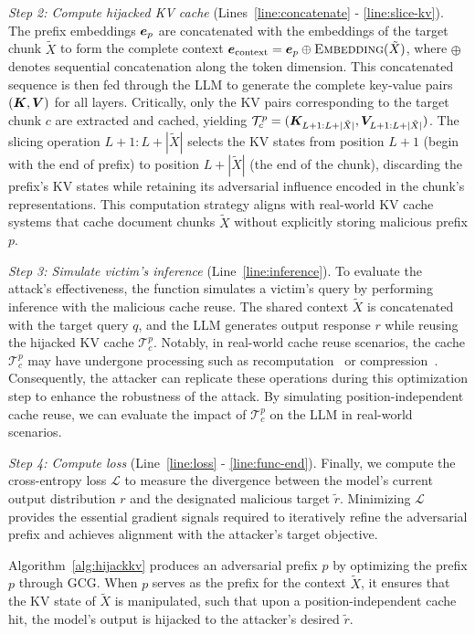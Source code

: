 \textit{Step 2: Compute hijacked KV cache} (Lines~\ref{line:concatenate} - \ref{line:slice-kv}). The prefix embeddings $\bm{e}_p$ are concatenated with the embeddings of the target chunk $\tilde{X}$ to form the complete context $\bm{e}_{\text{context}} = \bm{e}_p \oplus \textsc{Embedding}(\tilde{X})$, where $\oplus$ denotes sequential concatenation along the token dimension. This concatenated sequence is then fed through the LLM to generate the complete key-value pairs $(\bm{K}, \bm{V})$ for all layers. Critically, only the KV pairs corresponding to the target chunk $c$ are extracted and cached, yielding $\mathcal{T}^p_c = (\bm{K}_{L+1:L+|\tilde{X}|}, \bm{V}_{L+1:L+|\tilde{X}|})$. The slicing operation $L+1:L+|\tilde{X}|$ selects the KV states from position $L+1$ (begin with the end of prefix) to position $L+|\tilde{X}|$ (the end of the chunk), discarding the prefix's KV states while retaining its adversarial influence encoded in the chunk's representations. This computation strategy aligns with real-world KV cache systems that cache document chunks $\tilde{X}$ without explicitly storing malicious prefix $p$.

\textit{Step 3: Simulate victim's inference} (Line~\ref{line:inference}). To evaluate the attack's effectiveness, the function simulates a victim's query by performing inference with the malicious cache reuse. The shared context $\tilde{X}$ is concatenated with the target query $q$, and the LLM generates output response $r$ while reusing the hijacked KV cache $\mathcal{T}^p_c$. Notably, in real-world cache reuse scenarios, the cache $\mathcal{T}^p_c$ may have undergone processing such as recomputation~\cite{yao2025cacheblend, hu2025epic} or compression~\cite{zhang2023h2o, liu2023scissorhands}. Consequently, the attacker can replicate these operations during this optimization step to enhance the robustness of the attack. By simulating position-independent cache reuse, we can evaluate the impact of $\mathcal{T}^p_c$ on the LLM in real-world scenarios.

\textit{Step 4: Compute loss} (Line~\ref{line:loss} - \ref{line:func-end}). Finally, we compute the cross-entropy loss $\mathcal{L}$ to measure the divergence between the model's current output distribution $r$ and the designated malicious target $\tilde{r}$. Minimizing $\mathcal{L}$ provides the essential gradient signals required to iteratively refine the adversarial prefix and achieves alignment with the attacker's target objective.

Algorithm~\ref{alg:hijackkv} produces an adversarial prefix $p$ by optimizing the prefix $p$ through GCG. When $p$ serves as the prefix for the context $\tilde{X}$, it ensures that the KV state of $\tilde{X}$ is manipulated, such that upon a position-independent cache hit, the model's output is hijacked to the attacker's desired $\tilde{r}$.